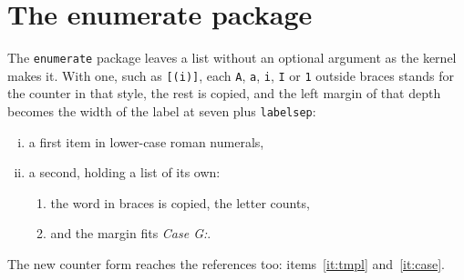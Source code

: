 \documentclass{article}
\begin{document}
\section{The enumerate package}
The \texttt{enumerate} package leaves a list without an optional argument as the kernel
makes it. With one, such as \texttt{[(i)]}, each \texttt{A}, \texttt{a}, \texttt{i},
\texttt{I} or \texttt{1} outside braces stands for the counter in that style, the rest is
copied, and the left margin of that depth becomes the width of the label at seven plus
\texttt{labelsep}:
\begin{enumerate}[(i)]
  \item a first item in lower-case roman numerals,\label{it:tmpl}
  \item a second, holding a list of its own:
    \begin{enumerate}[{Case} A:]
      \item the word in braces is copied, the letter counts,\label{it:case}
      \item and the margin fits \emph{Case G:}.
    \end{enumerate}
\end{enumerate}
The new counter form reaches the references too: items~\ref{it:tmpl} and~\ref{it:case}.
\end{document}
